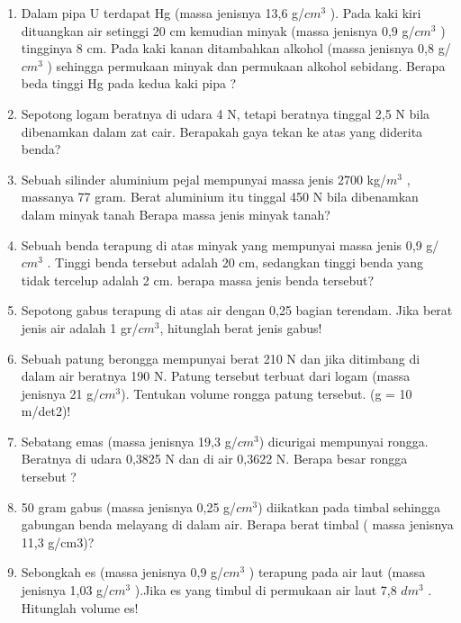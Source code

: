 \documentclass[12pt,a4paper,draft,final,oneside,twoside,openright,openany]{article}
\begin{document}
\begin{enumerate}
		\item Dalam pipa U terdapat Hg (massa jenisnya 13,6 g/$cm^3$ ). Pada kaki kiri dituangkan air setinggi 20 cm kemudian minyak (massa jenisnya 0,9 g/$cm^3$ ) tingginya 8 cm. Pada kaki kanan ditambahkan alkohol (massa jenisnya 0,8 g/$cm^3$ ) sehingga permukaan minyak dan permukaan alkohol sebidang. Berapa beda tinggi Hg pada kedua kaki pipa ?
		\item Sepotong logam beratnya di udara 4 N, tetapi beratnya tinggal 2,5 N bila dibenamkan dalam
		zat cair. Berapakah gaya tekan ke atas yang diderita benda?
		\item Sebuah silinder aluminium pejal mempunyai massa jenis 2700 kg/$m^3$ , massanya 77 gram.
		Berat aluminium itu tinggal 450 N bila dibenamkan dalam minyak tanah Berapa massa jenis
		minyak tanah?
		\item Sebuah benda terapung di atas minyak yang mempunyai massa jenis 0,9 g/$cm^3$ . Tinggi benda
		tersebut adalah 20 cm, sedangkan tinggi benda yang tidak tercelup adalah 2 cm. berapa
		massa jenis benda tersebut?
		\item Sepotong gabus terapung di atas air dengan 0,25 bagian terendam. Jika berat jenis air adalah 1 gr/$cm^3$, hitunglah berat jenis gabus!
		\item Sebuah patung berongga mempunyai berat 210 N dan jika ditimbang di dalam air beratnya 190 N. Patung tersebut terbuat dari logam (massa jenisnya 21 g/$cm^3$). Tentukan volume rongga patung tersebut. (g = 10 m/det2)!
		\item Sebatang emas (massa jenisnya 19,3 g/$cm^3$) dicurigai mempunyai rongga. Beratnya di udara 0,3825 N dan di air 0,3622 N. Berapa besar rongga tersebut ?
		\item 50 gram gabus (massa jenisnya 0,25 g/$cm^3$) diikatkan pada timbal sehingga gabungan benda melayang di dalam air. Berapa berat timbal ( massa jenisnya 11,3 g/cm3)?
		\item Sebongkah es (massa jenisnya 0,9 g/$cm^3$ ) terapung pada air laut (massa jenisnya 1,03 g/$cm^3$ ).Jika es yang timbul di permukaan air laut 7,8 $dm^3$ . Hitunglah volume es!
		
	\end{enumerate}
\end{document}

